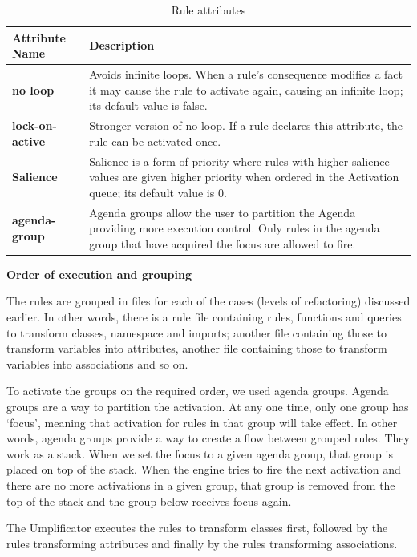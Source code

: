 \begin{table}[h]
\caption{Rule attributes}
\centering
\label{table:ruleattributes}
\begin{tabular}{l|p{9cm}}
\toprule
\rowcolor[HTML]{BBDAFF}
\textbf{Attribute Name} & \textbf{Description}   \\ \midrule
\textbf{no loop} & Avoids infinite loops. When a rule's consequence modifies a fact it may cause the rule to activate again, causing an infinite loop; its default value is false.\\ \hline
\textbf{lock-on-active} &  Stronger version of no-loop. If a rule declares this attribute, the rule can be activated once.   \\ \hline
\textbf{Salience} & Salience is a form of priority where rules with higher salience values are given higher priority when ordered in the Activation queue; its default value is 0. \\ \hline
\textbf{agenda-group} & Agenda groups allow the user to partition the Agenda providing more execution control. Only rules in the agenda group that have acquired the focus are allowed to fire.     \\ \bottomrule
\end{tabular}
\end{table}

\textbf{Order of execution and grouping}

The rules are grouped in files for each of the cases (levels of refactoring) discussed earlier. In other words, there is a rule file containing rules, functions and queries to transform classes, namespace and imports; another file containing those to transform variables into attributes, another file containing those to transform variables into associations and so on.

To activate the groups on the required order, we used agenda groups. Agenda groups are a way to partition the activation. At any one time, only one group has `focus', meaning that activation for rules in that group will take effect. 
In other words, agenda groups provide a way to create a flow between grouped rules. They work as a stack. When we set the focus to a given agenda group, that group is placed on top of the stack. When the engine tries to fire the next activation and there are no more activations in a given group, that group is removed from the top of the stack and the group below receives focus again.

The Umplificator executes the rules to transform classes first, followed by the rules transforming attributes and finally by the rules transforming associations. 

